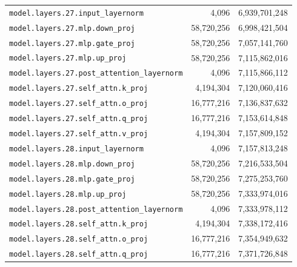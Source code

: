 \documentclass[10pt,a4paper]{article}
\theoremstyle{definition}
\begin{document}
\begin{appendices}
\begin{longtable}{p{9.5cm}rr}
\texttt{model.\allowbreak{}layers.\allowbreak{}27.\allowbreak{}input\_layernorm} & 4,096 & 6,939,701,248 \\
\texttt{model.\allowbreak{}layers.\allowbreak{}27.\allowbreak{}mlp.\allowbreak{}down\_proj} & 58,720,256 & 6,998,421,504 \\
\texttt{model.\allowbreak{}layers.\allowbreak{}27.\allowbreak{}mlp.\allowbreak{}gate\_proj} & 58,720,256 & 7,057,141,760 \\
\texttt{model.\allowbreak{}layers.\allowbreak{}27.\allowbreak{}mlp.\allowbreak{}up\_proj} & 58,720,256 & 7,115,862,016 \\
\texttt{model.\allowbreak{}layers.\allowbreak{}27.\allowbreak{}post\_attention\_layernorm} & 4,096 & 7,115,866,112 \\
\texttt{model.\allowbreak{}layers.\allowbreak{}27.\allowbreak{}self\_attn.\allowbreak{}k\_proj} & 4,194,304 & 7,120,060,416 \\
\texttt{model.\allowbreak{}layers.\allowbreak{}27.\allowbreak{}self\_attn.\allowbreak{}o\_proj} & 16,777,216 & 7,136,837,632 \\
\texttt{model.\allowbreak{}layers.\allowbreak{}27.\allowbreak{}self\_attn.\allowbreak{}q\_proj} & 16,777,216 & 7,153,614,848 \\
\texttt{model.\allowbreak{}layers.\allowbreak{}27.\allowbreak{}self\_attn.\allowbreak{}v\_proj} & 4,194,304 & 7,157,809,152 \\
\texttt{model.\allowbreak{}layers.\allowbreak{}28.\allowbreak{}input\_layernorm} & 4,096 & 7,157,813,248 \\
\texttt{model.\allowbreak{}layers.\allowbreak{}28.\allowbreak{}mlp.\allowbreak{}down\_proj} & 58,720,256 & 7,216,533,504 \\
\texttt{model.\allowbreak{}layers.\allowbreak{}28.\allowbreak{}mlp.\allowbreak{}gate\_proj} & 58,720,256 & 7,275,253,760 \\
\texttt{model.\allowbreak{}layers.\allowbreak{}28.\allowbreak{}mlp.\allowbreak{}up\_proj} & 58,720,256 & 7,333,974,016 \\
\texttt{model.\allowbreak{}layers.\allowbreak{}28.\allowbreak{}post\_attention\_layernorm} & 4,096 & 7,333,978,112 \\
\texttt{model.\allowbreak{}layers.\allowbreak{}28.\allowbreak{}self\_attn.\allowbreak{}k\_proj} & 4,194,304 & 7,338,172,416 \\
\texttt{model.\allowbreak{}layers.\allowbreak{}28.\allowbreak{}self\_attn.\allowbreak{}o\_proj} & 16,777,216 & 7,354,949,632 \\
\texttt{model.\allowbreak{}layers.\allowbreak{}28.\allowbreak{}self\_attn.\allowbreak{}q\_proj} & 16,777,216 & 7,371,726,848 \\

\end{longtable}
\end{appendices}
\end{document}
